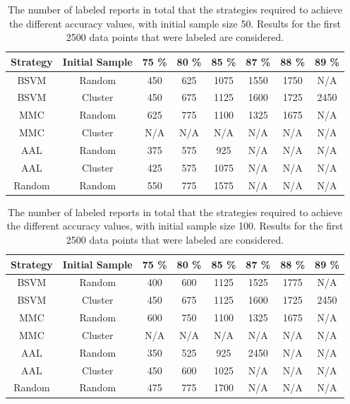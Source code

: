 \begin{table}
    \centering
    \begin{tabular}{|cccccccc|}
        \hline
        \textbf{Strategy} & \textbf{Initial Sample} & \textbf{75 \%} & \textbf{80 \%} & \textbf{85 \%} & \textbf{87 \%} & \textbf{88 \%} & \textbf{89 \%}\\
        \hline
        BSVM & Random & 450 & 625 & 1075 & 1550 & 1750 & N/A\\
        BSVM & Cluster & 450 & 675 & 1125 & 1600 & 1725 & 2450\\
        MMC & Random & 625 & 775 & 1100 & 1325 & 1675 & N/A\\
        MMC & Cluster & N/A & N/A & N/A & N/A & N/A & N/A\\
        AAL & Random & 375 & 575 & 925 & N/A & N/A & N/A\\
        AAL & Cluster & 425 & 575 & 1075 & N/A & N/A & N/A\\
        Random & Random & 550 & 775 & 1575 & N/A & N/A & N/A\\
        \hline
    \end{tabular}
    \caption{The number of labeled reports in total that the strategies required to achieve the different accuracy values, with initial sample size 50. Results for the first 2500 data points that were labeled are considered.}
    \label{tab:active-learning-accuracy-50}
\end{table}

\begin{table}
    \centering
    \begin{tabular}{|cccccccc|}
        \hline
        \textbf{Strategy} & \textbf{Initial Sample} & \textbf{75 \%} & \textbf{80 \%} & \textbf{85 \%} & \textbf{87 \%} & \textbf{88 \%} & \textbf{89 \%}\\
        \hline
        BSVM & Random & 400 & 600 & 1125 & 1525 & 1775 & N/A\\
        BSVM & Cluster & 450 & 675 & 1125 & 1600 & 1725 & 2450\\
        MMC & Random & 600 & 750 & 1100 & 1325 & 1675 & N/A\\
        MMC & Cluster & N/A & N/A & N/A & N/A & N/A & N/A\\
        AAL & Random & 350 & 525 & 925 & 2450 & N/A & N/A\\
        AAL & Cluster & 450 & 600 & 1025 & N/A & N/A & N/A\\
        Random & Random & 475 & 775 & 1700 & N/A & N/A & N/A\\
        \hline
    \end{tabular}
    \caption{The number of labeled reports in total that the strategies required to achieve the different accuracy values, with initial sample size 100. Results for the first 2500 data points that were labeled are considered.}
    \label{tab:active-learning-accuracy-100}
\end{table}

